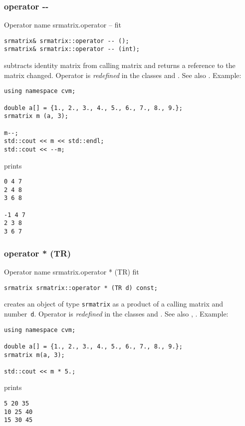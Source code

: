 \subsubsection{operator -{}-}
Operator%
\pdfdest name {srmatrix.operator --} fit
\begin{verbatim}
srmatrix& srmatrix::operator -- ();
srmatrix& srmatrix::operator -- (int);
\end{verbatim}
subtracts identity matrix from  calling matrix
and returns a reference to
the matrix changed.
Operator is \emph{redefined} in the classes
 and .
See also .
Example:
\begin{Verbatim}
using namespace cvm;

double a[] = {1., 2., 3., 4., 5., 6., 7., 8., 9.};
srmatrix m (a, 3);

m--;
std::cout << m << std::endl;
std::cout << --m;
\end{Verbatim}
prints
\begin{Verbatim}
0 4 7
2 4 8
3 6 8

-1 4 7
2 3 8
3 6 7
\end{Verbatim}
\newpage



\subsubsection{operator * (TR)}
Operator%
\pdfdest name {srmatrix.operator * (TR)} fit
\begin{verbatim}
srmatrix srmatrix::operator * (TR d) const;
\end{verbatim}
creates an object of type \verb"srmatrix" as a product of
a calling matrix and  number~\verb"d".
Operator is \emph{redefined} in the classes
and .
See also ,
.
Example:
\begin{Verbatim}
using namespace cvm;

double a[] = {1., 2., 3., 4., 5., 6., 7., 8., 9.};
srmatrix m(a, 3);

std::cout << m * 5.;
\end{Verbatim}
prints
\begin{Verbatim}
5 20 35
10 25 40
15 30 45
\end{Verbatim}
\newpage



